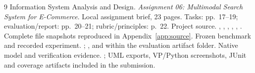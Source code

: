 \documentclass[11pt,a4paper]{article}
\begin{document}
\clearpage
\begin{thebibliography}{9}
 Information System Analysis and Design. \emph{Assignment 06: Multimodal Search System for E-Commerce}. Local assignment brief, 23 pages. Tasks: pp.~17--19; evaluation/report: pp.~20--21; rubric/principles: p.~22.
 Project source. , , , , , . Complete file snapshots reproduced in Appendix~\ref{app:source}.
 Frozen benchmark and recorded experiment. ; ,  and  within the evaluation artifact folder.
 Native model and verification evidence. ; UML exports, VP/Python screenshots, JUnit and coverage artifacts included in the submission.
\end{thebibliography}
\end{document}
